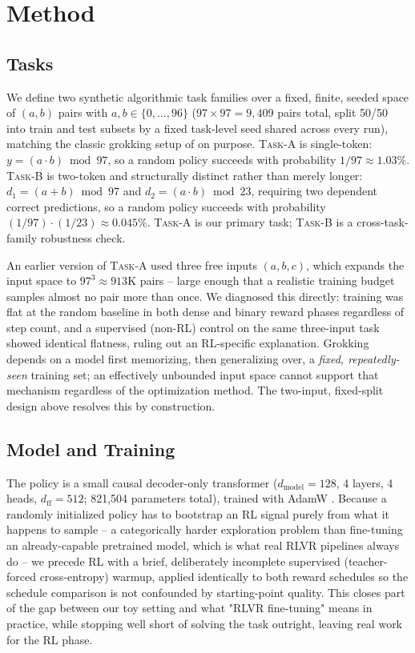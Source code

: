 \documentclass{article}
\newcommand{\taskA}{\textsc{Task-A}}
\newcommand{\taskB}{\textsc{Task-B}}
\begin{document}
\section{Method}
\label{sec:method}

\subsection{Tasks}
\label{sec:tasks}

We define two synthetic algorithmic task families over a fixed, finite,
seeded space of $(a,b)$ pairs with $a,b \in \{0,\dots,96\}$
($97 \times 97 = 9{,}409$ pairs total, split 50/50 into train and test subsets
by a fixed task-level seed shared across every run), matching the classic
grokking setup of \citet{power2022grokking} on purpose. \taskA{} is
single-token: $y = (a \cdot b) \bmod 97$, so a random policy succeeds with
probability $1/97 \approx 1.03\%$. \taskB{} is two-token and structurally
distinct rather than merely longer: $d_1 = (a+b) \bmod 97$ and
$d_2 = (a \cdot b) \bmod 23$, requiring two dependent correct predictions, so a
random policy succeeds with probability $(1/97)\!\cdot\!(1/23) \approx 0.045\%$.
\taskA{} is our primary task; \taskB{} is a cross-task-family robustness check.

An earlier version of \taskA{} used three free inputs $(a,b,c)$, which expands
the input space to $97^3 \approx 913$K pairs -- large enough that a realistic
training budget samples almost no pair more than once. We diagnosed this
directly: training was flat at the random baseline in both dense and binary
reward phases regardless of step count, and a supervised (non-RL) control on
the same three-input task showed identical flatness, ruling out an RL-specific
explanation. Grokking depends on a model first memorizing, then generalizing
over, a \emph{fixed, repeatedly-seen} training set; an effectively unbounded
input space cannot support that mechanism regardless of the optimization
method. The two-input, fixed-split design above resolves this by construction.

\subsection{Model and Training}
\label{sec:model}

The policy is a small causal decoder-only transformer
\citep{vaswani2017attention} ($d_{\text{model}}{=}128$, 4 layers, 4 heads,
$d_{\text{ff}}{=}512$; 821,504 parameters total), trained with AdamW
\citep{loshchilov2019decoupled}. Because a randomly initialized policy has to
bootstrap an RL signal purely from what it happens to sample -- a
categorically harder exploration problem than fine-tuning an already-capable
pretrained model, which is what real RLVR pipelines always do -- we precede RL
with a brief, deliberately incomplete supervised (teacher-forced
cross-entropy) warmup, applied identically to both reward schedules so the
schedule comparison is not confounded by starting-point quality. This closes
part of the gap between our toy setting and what "RLVR fine-tuning" means in
practice, while stopping well short of solving the task outright, leaving real
work for the RL phase.
\end{document}

